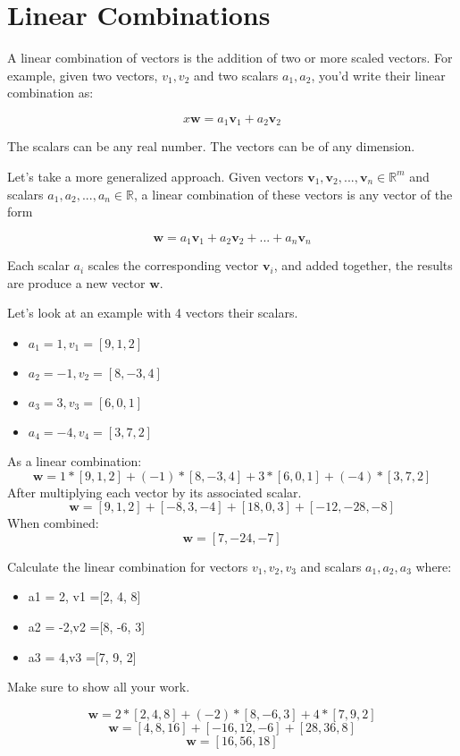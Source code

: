 \chapter{Linear Combinations}

A linear combination of vectors is the addition of two or more scaled vectors. For example, given two vectors, ${v}_1, {v}_2$ and two scalars $a_1,a_2$, you'd write their linear combination as:

\[x
\mathbf{w} = a_1\mathbf{v}_1 + a_2\mathbf{v}_2
\]

The scalars can be any real number. The vectors can be of any dimension. 

Let's take a more generalized approach. Given vectors $\mathbf{v}_1,
\mathbf{v}_2, ..., \mathbf{v}_n \in \mathbb{R}^m$ and scalars $a_1,
a_2, ..., a_n \in \mathbb{R}$, a linear combination of these vectors
is any vector of the form

\[
\mathbf{w} = a_1\mathbf{v}_1 + a_2\mathbf{v}_2 + ... + a_n\mathbf{v}_n
\]

Each scalar $a_i$ scales the corresponding vector $\mathbf{v}_i$, and
added together, the results are produce a new vector $\mathbf{w}$.

Let's look at an example with 4 vectors their scalars. 
\begin{itemize}
	\item $a_1 = 1, v_1 = [9, 1, 2]$
	\item $a_2 = -1, v_2 = [8, -3, 4]$
	\item $a_3 = 3, v_3 = [6, 0, 1]$
	\item $a_4 = -4, v_4 = [3, 7, 2]$
\end{itemize}
As a linear combination:
\[
\mathbf{w} = 1*[9,1,2] + (-1)*[8, -3, 4]+ 3*[6,0,1] + (-4)*[3,7,2]
\]
After multiplying each vector by its associated scalar.
 \[
\mathbf{w} = [9, 1, 2] + [-8, 3, -4] + [18, 0, 3] + [-12, -28, -8]
\]
When combined:
\[
\mathbf{w} = [7, -24, -7]
\]

\begin{Exercise}[title={Linear Combination}, label=linearCombo]
Calculate the linear combination 
for vectors $v_1, v_2, v_3$ and
scalars $a_1, a_2,a_3$ where:   
	\begin{itemize}
      \item a1 = 2, v1 =[2, 4, 8]
      \item a2 = -2,v2 =[8, -6, 3]
      \item a3 = 4,v3 =[7, 9, 2]
	\end{itemize}
Make sure to show all your work. 
\end{Exercise}
\begin{Answer}[ref=linearCombo]
     \[
	\mathbf{w} = 2*[2,4,8] + (-2)*[8,-6,3] + 4*[7,9,2] 
	\]
  	\[
	\mathbf{w} = [4,8,16] + [-16,12,-6] + [28,36,8] 
	\]  
 	\[
	\mathbf{w} = [16, 56, 18]  
	\]   
\end{Answer}

